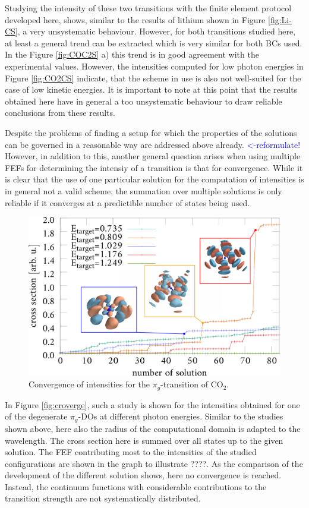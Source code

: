 Studying the intensity of these two transitions with the finite element protocol developed here, shows, similar to the results of lithium shown in Figure \ref{fig:Li-CS}, a very unsystematic behaviour.
However, for both transitions studied here, at least a general trend can be extracted which is very similar for both BCs used.
In the Figure \ref{fig:COC2S} a) this trend is in good agreement with the experimental values.
However, the intensities computed for low photon energies in Figure \ref{fig:CO2CS} indicate, that the scheme in use is also not well-suited for the case of low kinetic energies.
It is important to note at this point that the results obtained here have in general a too unsystematic behaviour to draw reliable conclusions from these results.

Despite the problems of finding a setup for which the properties of the solutions can be governed in a reasonable way are addressed above already. \textcolor{blue}{<-reformulate!}
However, in addition to this, another general question arises when using multiple FEFs for determining the intensiy of a transition is that for convergence.
While it is clear that the use of one particular solution for the computation of intensities is in general not a valid scheme, the summation over multiple solutions is only reliable if it converges at a predictible number of states being used.
\begin{figure}
\includegraphics[width=\textwidth]{Figures/CO2/Cronverge}
\caption{Convergence of intensities for the $\pi_g$-transition of CO$_2$.}
\label{fig:cronverge}
\end{figure}
In Figure \ref{fig:croverge}, such a study is shown for the intensities obtained for one of the degenerate $\pi_g$-DOs at different photon energies.
Similar to the studies shown above, here also the radius of the computational domain is adapted to the wavelength.
The cross section here is summed over all states up to the given solution.
The FEF contributing most to the intensities of the studied configurations are shown in the graph to illustrate ????.
As the comparison of the development of the different solution shows, here no convergence is reached.
Instead, the continuum functions with considerable contributions to the transition strength are not systematically distributed.

